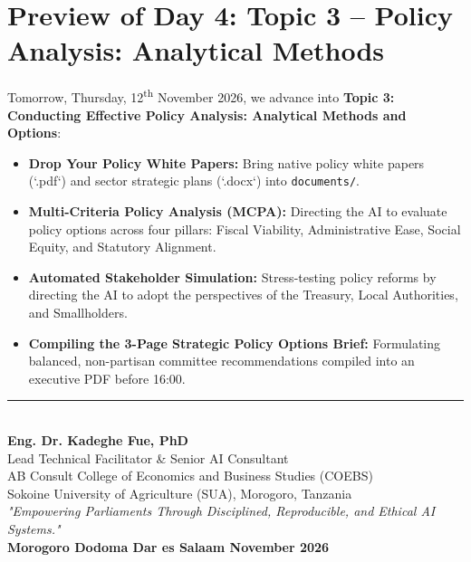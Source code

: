 \documentclass[11pt, a4paper]{report}
\begin{document}
\section{Preview of Day 4: Topic 3 -- Policy Analysis: Analytical Methods}
Tomorrow, Thursday, 12\textsuperscript{th} November 2026, we advance into \textcolor{suagreen}{\textbf{Topic 3: Conducting Effective Policy Analysis: Analytical Methods and Options}}:
\begin{itemize}[label=-]
    \item \textbf{Drop Your Policy White Papers:} Bring native policy white papers (`.pdf`) and sector strategic plans (`.docx`) into \texttt{documents/}.
    \item \textbf{Multi-Criteria Policy Analysis (MCPA):} Directing the AI to evaluate policy options across four pillars: Fiscal Viability, Administrative Ease, Social Equity, and Statutory Alignment.
    \item \textbf{Automated Stakeholder Simulation:} Stress-testing policy reforms by directing the AI to adopt the perspectives of the Treasury, Local Authorities, and Smallholders.
    \item \textbf{Compiling the 3-Page Strategic Policy Options Brief:} Formulating balanced, non-partisan committee recommendations compiled into an executive PDF before 16:00.
\end{itemize}

\vspace{1.5cm}
\begin{center}
    \rule{0.65\textwidth}{0.4pt}\\[0.3cm]
    \textbf{\Large Eng. Dr. Kadeghe Fue, PhD}\\
    Lead Technical Facilitator \& Senior AI Consultant\\
    AB Consult \textbullet{} College of Economics and Business Studies (COEBS)\\
    Sokoine University of Agriculture (SUA), Morogoro, Tanzania\\[0.3cm]
    \small\textit{"Empowering Parliaments Through Disciplined, Reproducible, and Ethical AI Systems."}\\[0.5cm]
    \textbf{Morogoro \textbullet{} Dodoma \textbullet{} Dar es Salaam \textbullet{} November 2026}
\end{center}
\end{document}
